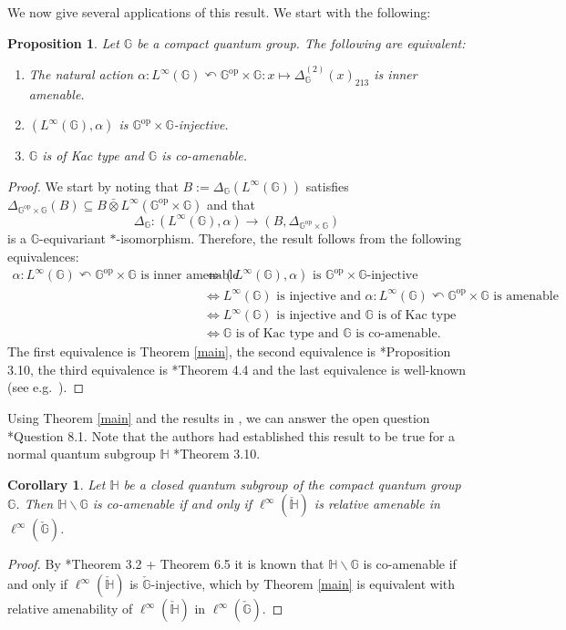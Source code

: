 \documentclass[reqno]{amsart}
\numberwithin{equation}{section}
\newtheorem{Prop}[Theorem]{Proposition}
\newtheorem{Cor}[Theorem]{Corollary}
\newcommand{\op}{\mathrm{op}}
\newcommand{\G}{\mathbb{G}}
\newcommand{\ovot}{\bar{\otimes}}
\begin{document}
We now give several applications of this result. We start with the following:
\begin{Prop}
    Let $\G$ be a compact quantum group. The following are equivalent:
    \begin{enumerate}\setlength\itemsep{-0.5em}
        \item The natural action $\alpha: L^\infty(\G)\curvearrowleft \G^{\op}\times \G: x \mapsto \Delta_\G^{(2)}(x)_{213}$ is inner amenable.
        \item $(L^\infty(\G), \alpha)$ is $\G^{\op}\times \G$-injective.
        \item $\G$ is of Kac type and $\G$ is co-amenable.
    \end{enumerate}
\end{Prop}
\begin{proof} We start by noting that $B:=\Delta_\G(L^\infty(\G))$ satisfies $\Delta_{\G^{\op}\times \G}(B)\subseteq B \ovot L^\infty(\G^{\op}\times \G)$ and that 
$$\Delta_\G: (L^\infty(\G), \alpha)\to (B, \Delta_{\G^{\op}\times \G})$$
is a $\G$-equivariant $*$-isomorphism. Therefore, the result follows from the following equivalences:
\begin{align*}\alpha: L^\infty(\G)\curvearrowleft \G^{\op}\times \G \text{ is inner amenable} &\iff (L^\infty(\G), \alpha) \text{ is } \G^{\op}\times \G\text{-injective}\\
&\iff L^\infty(\G) \text{ is injective and } \alpha: L^\infty(\G)\curvearrowleft \G^{\op}\times \G \text{ is amenable}\\
&\iff L^\infty(\G) \text{ is injective and } \G \text{ is of Kac type}\\
&\iff \G \text{ is of Kac type and } \G \text{ is co-amenable.}
\end{align*}
The first equivalence is Theorem \ref{main}, the second equivalence is \cite{DR24a}*{Proposition 3.10}, the third equivalence is \cite{DCDR24b}*{Theorem 4.4} and the last equivalence is well-known (see e.g.\ \cite{Rua96}).
\end{proof}

Using Theorem \ref{main} and the results in \cite{AK24}, we can answer the open question \cite{KKSV22}*{Question 8.1}. Note that the authors had established this result to be true for a normal quantum subgroup $\mathbb{H}$ \cite{KKSV22}*{Theorem 3.10}.
\begin{Cor}\label{ezcor}
    Let $\mathbb{H}$ be a closed quantum subgroup of the compact quantum group $\G$. Then $\mathbb{H}\backslash \G$ is co-amenable if and only if $\ell^\infty(\check{\mathbb{H}})$ is relative amenable in $\ell^\infty(\check{\G})$.
\end{Cor}
\begin{proof}
    By \cite{AK24}*{Theorem 3.2 + Theorem 6.5} it is known that $\mathbb{H}\backslash \G$ is co-amenable if and only if $\ell^\infty(\check{\mathbb{H}})$ is $\check{\G}$-injective, which by Theorem \ref{main} is equivalent with relative amenability of $\ell^\infty(\check{\mathbb{H}})$ in $\ell^\infty(\check{\G}).$
\end{proof}
\end{document}
